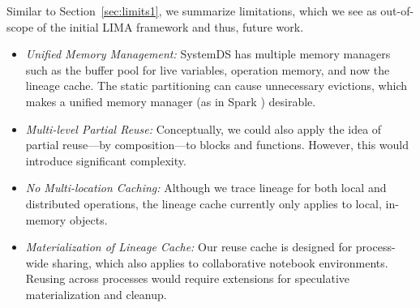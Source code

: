 Similar to Section~\ref{sec:limits1}, we summarize limitations, which we see as out-of-scope of the initial LIMA framework and thus, future work.
\begin{itemize}
\item \emph{Unified Memory Management:} SystemDS has multiple memory managers such as the buffer pool for live variables, operation memory, and now the lineage cache. The static partitioning can cause unnecessary evictions, which makes a unified memory manager (as in Spark \cite{UnifiedMem}) desirable.
\item \emph{Multi-level Partial Reuse:} Conceptually, we could also apply the idea of partial reuse---by composition---to blocks and functions. However, this would introduce significant complexity.
\item \emph{No Multi-location Caching:} Although we trace lineage for both local and distributed operations, the lineage cache currently only applies to local, in-memory objects. %
\item\emph{Materialization of Lineage Cache:} Our reuse cache is designed for process-wide sharing, which also applies to collaborative notebook environments. Reusing across processes would require extensions for speculative materialization and cleanup.
\end{itemize}

